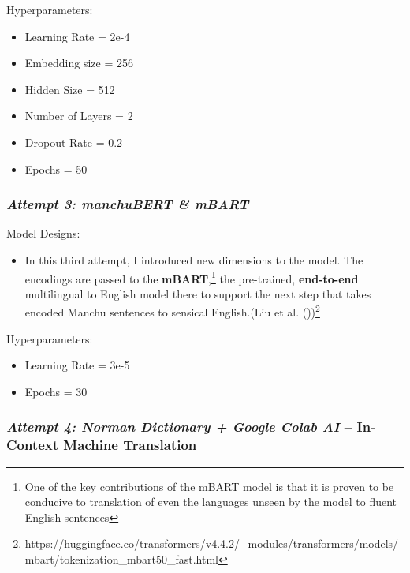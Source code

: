 \documentclass[
  letterpaper,
  DIV=11,
  numbers=noendperiod]{scrartcl}
\providecommand{\tightlist}{%
  \setlength{\itemsep}{0pt}\setlength{\parskip}{0pt}}\usepackage{longtable,booktabs,array}
\begin{document}
Hyperparameters:

\begin{itemize}
\tightlist
\item
  Learning Rate = 2e-4
\item
  Embedding size = 256
\item
  Hidden Size = 512
\item
  Number of Layers = 2
\item
  Dropout Rate = 0.2
\item
  Epochs = 50
\end{itemize}

\subsubsection{\texorpdfstring{\emph{Attempt 3: manchuBERT \&
mBART}}{Attempt 3: manchuBERT \& mBART}}\label{attempt-3-manchubert-mbart}

Model Designs:

\begin{itemize}
\tightlist
\item
  In this third attempt, I introduced new dimensions to the model. The
  encodings are passed to the \textbf{mBART},\footnote{One of the key
    contributions of the mBART model is that it is proven to be
    conducive to translation of even the languages unseen by the model
    to fluent English sentences} the pre-trained, \textbf{end-to-end}
  multilingual to English model there to support the next step that
  takes encoded Manchu sentences to sensical English.(Liu et al.
  ())\footnote{https://huggingface.co/transformers/v4.4.2/\_modules/transformers/models/mbart/tokenization\_mbart50\_fast.html}
\end{itemize}

Hyperparameters:

\begin{itemize}
\tightlist
\item
  Learning Rate = 3e-5
\item
  Epochs = 30
\end{itemize}

\subsubsection{\texorpdfstring{\emph{Attempt 4: Norman Dictionary +
Google Colab AI} -- In-Context Machine
Translation}{Attempt 4: Norman Dictionary + Google Colab AI -- In-Context Machine Translation}}\label{attempt-4-norman-dictionary-google-colab-ai-in-context-machine-translation}
\end{document}
